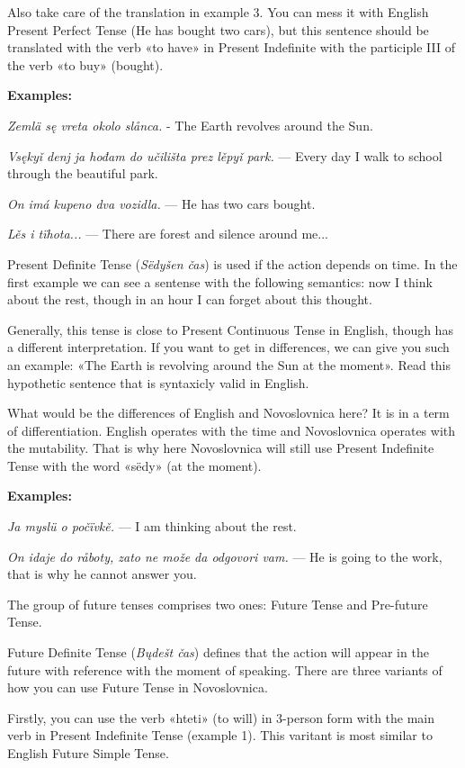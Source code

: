 Also take care of the translation in example 3. You can mess it with English Present Perfect Tense (He has bought two cars), but this sentence should be translated with the verb «to have» in Present Indefinite with the participle III of the verb «to buy» (bought).

\textbf{Examples:}

\textit{Zemlä sę vreta okolo slånca.} - The Earth revolves around the Sun.

\textit{Vsękyǐ denj ja hođam do učilišta prez lěpyǐ park.} — Every day I walk to school through the beautiful park.

\textit{On imá kupeno dva vozidla.} — He has two cars bought.

\textit{Lěs i tïhota...} — There are forest and silence around me...

Present Definite Tense (\textit{Sëdyšen čas}) is used if the action depends on time. In the first example we can see a sentense with the following semantics: now I think about the rest, though in an hour I can forget about this thought.

Generally, this tense is close to Present Continuous Tense in English, though has a different interpretation. If you want to get in differences, we can give you such an example: «The Earth is revolving around the Sun at the moment». Read this hypothetic sentence that is syntaxicly valid in English.

What would be the differences of English and Novoslovnica here? It is in a term of differentiation. English operates with the time and Novoslovnica operates with the mutability. That is why here Novoslovnica will still use Present Indefinite Tense with the word «sëdy» (at the moment).

\textbf{Examples:}

\textit{Ja myslü o počïvkě.} — I am thinking about the rest.

\textit{On idaje do råboty, zato ne može da odgovori vam.} — He is going to the work, that is why he cannot answer you.

The group of future tenses comprises two ones: Future Tense and Pre-future Tense.

Future Definite Tense (\textit{Bųdešt čas}) defines that the action will appear in the future with reference with the moment of speaking. There are three variants of how you can use Future Tense in Novoslovnica.

Firstly, you can use the verb «hteti» (to will) in 3-person form with the main verb in Present Indefinite Tense (example 1). This varitant is most similar to English Future Simple Tense.

